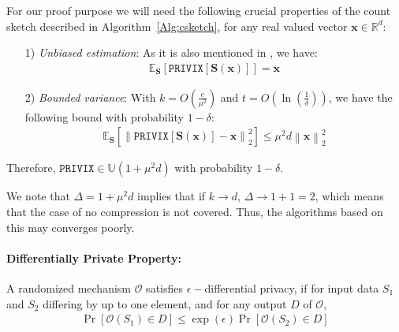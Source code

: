 \begin{property}
For our proof purpose we will need the following crucial properties of the count sketch described in Algorithm~\ref{Alg:csketch}, for any real valued vector $\mathbf{x}\in \mathbb{R}^{d}$:
\begin{itemize}
    \item[1)] \emph{Unbiased estimation}: As it is also mentioned in \cite{li2019privacy}, we have:
    \begin{align}
        \mathbb{E}_{\mathbf{S}}\left[\texttt{PRIVIX}\left[\mathbf{S}\left(\mathbf{x}\right)\right]\right]=\mathbf{x}
    \end{align}
    
    \item[2)] \emph{Bounded variance}: With $k=O\left(\frac{e}{\mu^2}\right)$ and $t=O\left(\ln \left(\frac{1}{\delta}\right)\right)$, we have the following bound with probability $1-\delta$:
    \begin{align}
        \mathbb{E}_{\mathbf{S}}\left[\left\|\texttt{PRIVIX}\left[\mathbf{S}\left(\mathbf{x}\right)\right]-\mathbf{x}\right\|_2^2\right]\leq \mu^2 d\left\|\mathbf{x}\right\|_2^2
    \end{align}
\end{itemize}
\end{property}
Therefore, $\texttt{PRIVIX}\in \mathbb{U}(1+\mu^2 d)$ with probability $1-\delta$.
\begin{remark}
We note that $\Delta=1+\mu^2d$ implies that if $k\rightarrow d$, $\Delta\rightarrow 1+1=2$, which means that the case of no compression is not covered. Thus, the algorithms based on this may converges poorly.
\end{remark}

\paragraph{Differentially Private Property:}
\begin{definition}
A randomized mechanism $\mathcal{O}$ satisfies $\epsilon-$differential privacy, if for input data ${S}_1$ and ${S}_2$ differing by up to one element, and for any output $D$ of $\mathcal{O}$,
\begin{align}
    \Pr\left[\mathcal{O}(S_1)\in D\right]\leq \exp{\left(\epsilon\right)}\Pr\left[\mathcal{O}(S_2)\in D\right] 
\end{align}
\end{definition}

